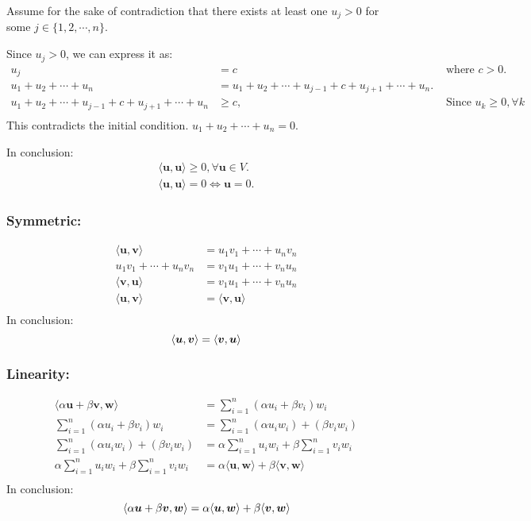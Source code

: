 \documentclass[a4paper,12pt]{article}
\begin{document}
Assume for the sake of contradiction that there exists at least one \(u_j > 0\) for some \(j \in \{1, 2, \cdots, n\}\).

Since \(u_j > 0\), we can express it as:
\begin{align*}
    u_j &= c &\text{ where } c > 0.  \\
    u_1 + u_2 + \cdots + u_n &= u_1 + u_2 + \cdots + u_{j - 1} + c + u_{j + 1} +\cdots +  u_n. \\
    u_1 + u_2 + \cdots + u_{j-1} + c + u_{j+1} + \cdots + u_n &\geq c, &\text{ Since } u_k \geq 0, \forall k \\
\end{align*}
This contradicts the initial condition. \(u_1 + u_2 + \cdots + u_n = 0\).

In conclusion:
\begin{align*}
    \langle\bm{u}, \bm{u} \rangle \geq 0, \forall \bm{u} \in V. \\
    \langle\bm{u}, \bm{u}\rangle = 0 \iff \bm{u} = 0.
\end{align*}

\subsubsection*{Symmetric:}
\begin{align*}
    \langle\bm{u}, \bm{v} \rangle &= u_1v_1 + \cdots + u_nv_n \\
    u_1v_1 + \cdots + u_nv_n &= v_1u_1 + \cdots + v_nu_n \\
    \langle\bm{v}, \bm{u} \rangle &= v_1u_1 + \cdots + v_nu_n \\
    \langle\bm{u}, \bm{v} \rangle &= \langle\bm{v}, \bm{u} \rangle \\
\end{align*}
In conclusion:
\[
    \langle\bm{u}, \bm{v} \rangle = \langle\bm{v}, \bm{u} \rangle \\
\]

\subsubsection*{Linearity:}
\begin{align*}
    \langle \alpha \bm{u} + \beta \bm{v}, \bm{w}\rangle &= \sum_{i=1}^{n} (\alpha u_i + \beta v_i) w_i \\
    \sum_{i=1}^{n} (\alpha u_i + \beta v_i) w_i  &= \sum_{i=1}^{n} (\alpha u_i w_i) + (\beta v_i w_i) \\
    \sum_{i=1}^{n} (\alpha u_i w_i) + (\beta v_i w_i) &= \alpha \sum_{i=1}^{n}u_iw_i + \beta \sum_{i=1}^{n}v_iw_i\\
    \alpha \sum_{i=1}^{n}u_iw_i + \beta \sum_{i=1}^{n}v_iw_i &=  \alpha \langle\bm{u}, \bm{w}\rangle + \beta \langle\bm{v}, \bm{w}\rangle \\
\end{align*}
In conclusion:
\[
    \langle \alpha \bm{u} + \beta \bm{v}, \bm{w} \rangle =  \alpha \langle\bm{u}, \bm{w}\rangle + \beta \langle\bm{v}, \bm{w}\rangle \\
\]
\end{document}
